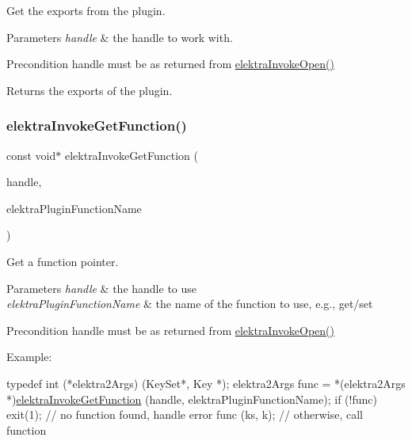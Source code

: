 Get the exports from the plugin. 


\begin{DoxyParams}{Parameters}
{\em handle} & the handle to work with.\\
\hline
\end{DoxyParams}
\begin{DoxyPrecond}{Precondition}
handle must be as returned from \hyperlink{group__invoke_ga3eb20131e9a8fc9a6cebf126927c09bc}{elektra\+Invoke\+Open()}
\end{DoxyPrecond}
\begin{DoxyReturn}{Returns}
the exports of the plugin. 
\end{DoxyReturn}
\mbox{\label{group__invoke_ga4531a643a71a63c19c94d87bd8d0b40f}} 
\subsubsection{\texorpdfstring{elektra\+Invoke\+Get\+Function()}{elektraInvokeGetFunction()}}
{\footnotesize\ttfamily const void$\ast$ elektra\+Invoke\+Get\+Function (\begin{DoxyParamCaption}\item[{Elektra\+Invoke\+Handle $\ast$}]{handle,  }\item[{const char $\ast$}]{elektra\+Plugin\+Function\+Name }\end{DoxyParamCaption})}



Get a function pointer. 


\begin{DoxyParams}{Parameters}
{\em handle} & the handle to use \\
\hline
{\em elektra\+Plugin\+Function\+Name} & the name of the function to use, e.\+g., get/set\\
\hline
\end{DoxyParams}
\begin{DoxyPrecond}{Precondition}
handle must be as returned from \hyperlink{group__invoke_ga3eb20131e9a8fc9a6cebf126927c09bc}{elektra\+Invoke\+Open()}
\end{DoxyPrecond}
Example\+:


\begin{DoxyCode}
\textcolor{keyword}{typedef} int (*elektra2Args) (KeySet*, Key *);
elektra2Args func = *(elektra2Args *)\hyperlink{group__invoke_ga4531a643a71a63c19c94d87bd8d0b40f}{elektraInvokeGetFunction} (handle, 
      elektraPluginFunctionName);
\textcolor{keywordflow}{if} (!func) exit(1);   \textcolor{comment}{// no function found, handle error}
func (ks, k);         \textcolor{comment}{// otherwise, call function}
\end{DoxyCode}



